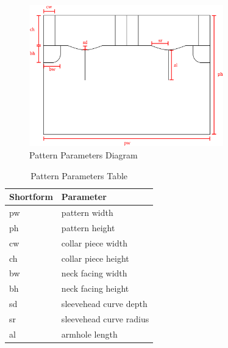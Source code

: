 \begin{figure} [H] %
    \centering %
    \includegraphics[width = 0.75\textwidth]{Images/pattern params.png} %
    \caption{Pattern Parameters Diagram}
    \label{} %
\end{figure}
\begin{table} [H] %
    \centering %
    \begin{tabular}{p{2cm}|p{6cm}} %
    
        \textbf{Shortform} & \textbf{Parameter}\\
        \hline %
        pw&  pattern width\\
        ph&  pattern height\\
        cw&  collar piece width\\
        ch&  collar piece height\\
        bw&  neck facing width\\
        bh& neck facing height\\
        sd& sleevehead curve depth\\
        sr& sleevehead curve radius\\
        al& armhole length
        \end{tabular}
    \caption{Pattern Parameters Table}
    \label{tab:ex_tab}
\end{table}

